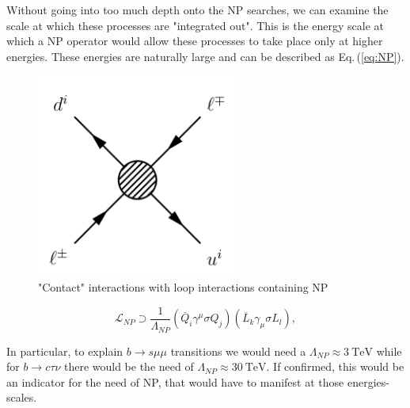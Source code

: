\documentclass[10pt]{report}
\begin{document}
Without going into too much depth onto the NP searches, we can examine the scale at which these processes are "integrated out". 
%
This is the energy scale at which a NP operator would allow these processes to take place only at higher energies. These energies are naturally large and can be described as Eq.\,(\ref{eq:NP}). 
%
\bigbreak
%
\noindent
%
\begin{minipage}{.35\textwidth}
\begin{figure}[H]
	\label{fig:contactNP}
	\centering
	\includegraphics[width=0.6\textwidth]{My_First_Diagram.png}
	\caption{"Contact" interactions with loop interactions containing NP}
\end{figure}
\end{minipage}
\begin{minipage}{.6\textwidth}
	\begin{equation}
	\label{eq:NP}
	\mathcal{L}_{NP} \supset \frac{1}{\Lambda_{NP}} (\overline{Q}_i \gamma^\mu \sigma Q_j ) (\overline{L}_k \gamma_\mu \sigma L_l) ,  
	\end{equation}
\end{minipage}
%
\bigbreak
%
In particular, to explain $b \rightarrow s \mu \mu$ transitions we would need a $\Lambda_{NP} \approx 3 \ \text{TeV}$ while for $b \rightarrow c \tau \nu$ there would be the need of $\Lambda_{NP} \approx 30\ \text{TeV}$.
%
If confirmed, this would be an indicator for the need of NP, that would have to manifest at those energies-scales.
\end{document}
